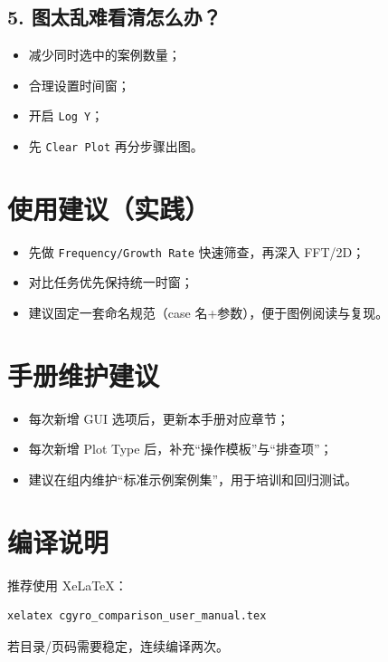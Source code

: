 \documentclass[11pt,a4paper]{ctexart}
\begin{document}
\subsection*{5. 图太乱难看清怎么办？}
\begin{itemize}
  \item 减少同时选中的案例数量；
  \item 合理设置时间窗；
  \item 开启 \texttt{Log Y}；
  \item 先 \texttt{Clear Plot} 再分步骤出图。
\end{itemize}

\section{使用建议（实践）}
\begin{itemize}
  \item 先做 \texttt{Frequency/Growth Rate} 快速筛查，再深入 FFT/2D；
  \item 对比任务优先保持统一时窗；
  \item 建议固定一套命名规范（case 名+参数），便于图例阅读与复现。
\end{itemize}

\section{手册维护建议}
\begin{itemize}
  \item 每次新增 GUI 选项后，更新本手册对应章节；
  \item 每次新增 Plot Type 后，补充“操作模板”与“排查项”；
  \item 建议在组内维护“标准示例案例集”，用于培训和回归测试。
\end{itemize}

\section{编译说明}
推荐使用 XeLaTeX：
\begin{lstlisting}
xelatex cgyro_comparison_user_manual.tex
\end{lstlisting}
若目录/页码需要稳定，连续编译两次。
\end{document}
